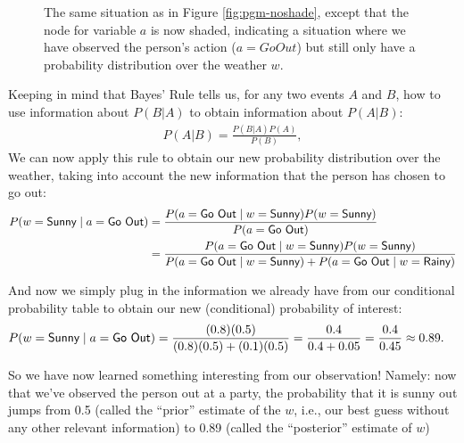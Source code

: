 \begin{figure}[!ht]
  \centering
  \label{fig:pgm-shaded}
  \caption{The same situation as in Figure \ref{fig:pgm-noshade}, except that the node for variable $a$ is now shaded, indicating a situation where we have observed the person’s action ($a = Go Out$) but still only have a probability distribution over the weather $w$.}
\end{figure}

Keeping in mind that Bayes’ Rule tells us, for any two events $A$ and $B$, how to use information about $P(B|A)$ to obtain information about $P(A|B)$:
\begin{align*}
P(A|B) = \frac{P(B|A)P(A)}{P(B)},
\end{align*}
We can now apply this rule to obtain our new probability distribution over the weather, taking into account the new information that the person has chosen to go out:
\begin{align*}
P(w = \textsf{Sunny}{} \; | \; a = \textsf{Go Out}{}) &= \frac{P(a = \textsf{Go Out}{} \; | \; w = \textsf{Sunny}{})P(w = \textsf{Sunny}{})}{P(a = \textsf{Go Out}{})} \\
&= \frac{P(a = \textsf{Go Out}{} \; | \; w = \textsf{Sunny}{})P(w = \textsf{Sunny}{})}{P(a = \textsf{Go Out}{} \; | \; w = \textsf{Sunny}{}) + P(a = \textsf{Go Out}{} \; | \; w = \textsf{Rainy}{})}
\end{align*}

And now we simply plug in the information we already have from our conditional probability table to obtain our new (conditional) probability of interest:
\begin{align*}
P(w = \textsf{Sunny}{} \; | \; a = \textsf{Go Out}{}) &= \frac{(0.8)(0.5)}{(0.8)(0.5) + (0.1)(0.5)} = \frac{0.4}{0.4 + 0.05} = \frac{0.4}{0.45} \approx 0.89.
\end{align*}

So we have now learned something interesting from our observation! Namely: now that we’ve observed the person out at a party, the probability that it is sunny out jumps from 0.5 (called the “prior” estimate of the $w$, i.e., our best guess without any other relevant information) to 0.89 (called the “posterior” estimate of $w$)

